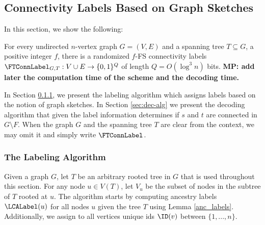 \subsection{Connectivity Labels Based on Graph Sketches}\label{sec:ftconn-sketch}


In this section, we show the following:
\begin{theorem}
For every undirected $n$-vertex graph $G=(V,E)$ and a spanning tree $T \subseteq G$, a positive integer $f$, there is a randomized $f$-FS connectivity labels $\FTConnLabel_{G,T}: V \cup E \to \{0,1\}^{Q}$ of length $Q=O(\log^3 n)$ bits. 
\textbf{MP: add later the computation time of the scheme and the decoding time.}
\end{theorem}
In Section \ref{sec:label-alg}, we present the labeling algorithm which assigns labels based on the notion of graph sketches. In Section \ref{sec:dec-alg} we present the decoding algorithm that given the label information determines if $s$ and $t$ are connected in $G \setminus F$. When the graph $G$ and the spanning tree $T$ are clear from the context, we may omit it and simply write $\FTConnLabel$. 



\subsubsection{The Labeling Algorithm}\label{sec:label-alg}
Given a graph $G$, let $T$ be an arbitrary rooted tree in $G$ that is used throughout this section.
For any node $u \in V(T)$, let $V_u$ be the subset of nodes in the subtree of $T$ rooted at $u$. The algorithm starts by computing ancestry labels $\LCALabel(u)$ for all nodes $u$ given the tree $T$ using Lemma \ref{anc_labels}. Additionally, we assign to all vertices unique ids $\ID(v)$ between $\{1,...,n \}.$

